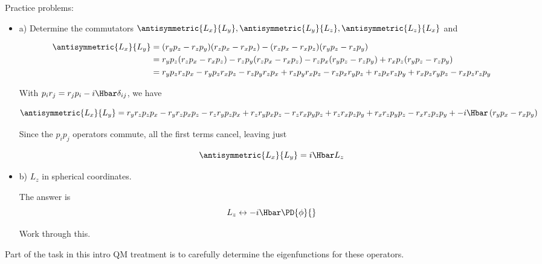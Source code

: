 Practice problems:
\begin{itemize}
\item a) Determine the commutators \(\antisymmetric{L_x}{L_y}, \antisymmetric{L_y}{L_z}, \antisymmetric{L_z}{L_x}\) and

\begin{equation}\label{eqn:lecture6OrbitalandIntrinsicMomentum:2040}
\begin{aligned}
\antisymmetric{L_x}{L_y}
&=
(r_y p_z -r_z p_y)
(r_z p_x -r_x p_z)
-
(r_z p_x -r_x p_z)
(r_y p_z -r_z p_y) \\
&=
r_y p_z (r_z p_x -r_x p_z)
-r_z p_y (r_z p_x -r_x p_z)
- r_z p_x (r_y p_z -r_z p_y)
+ r_x p_z (r_y p_z -r_z p_y) \\
&=
r_y p_z r_z p_x
-r_y p_z r_x p_z
-r_z p_y r_z p_x
+r_z p_y r_x p_z
- r_z p_x r_y p_z
+ r_z p_x r_z p_y
+ r_x p_z r_y p_z
- r_x p_z r_z p_y \\
\end{aligned}
\end{equation}

With \(p_i r_j = r_j p_i - i \Hbar \delta_{ij}\), we have

\begin{dmath*}
\antisymmetric{L_x}{L_y}
=
r_y r_z p_z p_x
-r_y r_z p_x p_z
-r_z r_y p_z p_x
+r_z r_y p_x p_z
- r_z r_x p_y p_z
+ r_z r_x p_z p_y
+ r_x r_z p_y p_z
- r_x r_z p_z p_y 
+
-i \Hbar
\left(
r_y p_x
- r_x p_y
\right)
\end{dmath*}

Since the \(p_i p_j\) operators commute, all the first terms cancel, leaving just

\begin{equation}\label{eqn:lecture6OrbitalandIntrinsicMomentum:2060}
\antisymmetric{L_x}{L_y}
=i \Hbar L_z
\end{equation}


\item b) \(L_z\) in spherical coordinates.

The answer is
\begin{equation}\label{eqn:PHY356Foct19:1003}
L_z \leftrightarrow -i \Hbar \PD{\phi}{}
\end{equation}

Work through this.
\end{itemize}

Part of the task in this intro QM treatment is to carefully determine the eigenfunctions for these operators.

